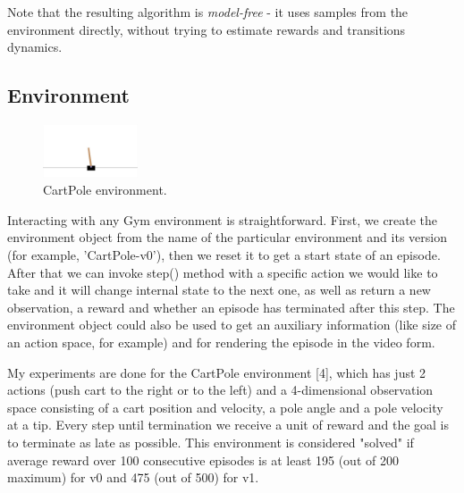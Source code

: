 \documentclass{article}
\begin{document}
Note that the resulting algorithm is {\it model-free} - it uses samples from the environment directly, without trying to estimate rewards and transitions dynamics.

\subsection{Environment}

\begin{figure} %
    \centering
    \includegraphics[width=0.25\textwidth]{cartpole}
    \caption{CartPole environment.}
\end{figure}

Interacting with any Gym environment is straightforward. First, we create the environment object from the name of the particular environment and its version (for example, 'CartPole-v0'), then we reset it to get a start state of an episode. After that we can invoke step() method with a specific action we would like to take and it will change internal state to the next one, as well as return a new observation, a reward and whether an episode has terminated after this step. The environment object could also be used to get an auxiliary information (like size of an action space, for example) and for rendering the episode in the video form.

My experiments are done for the CartPole environment [4], which has just 2 actions (push cart to the right or to the left) and a 4-dimensional observation space consisting of a cart position and velocity, a pole angle and a pole velocity at a tip. Every step until termination we receive a unit of reward and the goal is to terminate as late as possible. This environment is considered "solved" if average reward over 100 consecutive episodes is at least 195 (out of 200 maximum) for v0 and 475 (out of 500) for v1.
\end{document}
